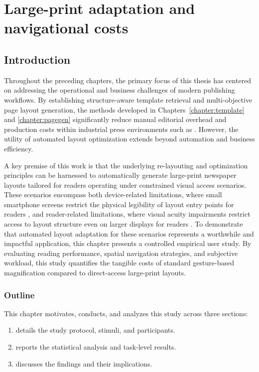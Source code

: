 \chapter{Large-print adaptation and navigational costs}
\label{chapter:magnification}


\section{Introduction}
\label{sec:magnification-overview}

Throughout the preceding chapters, the primary focus of this thesis has centered on addressing the operational and business challenges of modern publishing workflows. By establishing structure-aware template retrieval and multi-objective page layout generation, the methods developed in Chapters~\ref{chapter:template} and \ref{chapter:pagegen} significantly reduce manual editorial overhead and production costs within industrial press environments such as \melody. However, the utility of automated layout optimization extends beyond automation and business efficiency.

A key premise of this work is that the underlying re-layouting and optimization principles can be harnessed to automatically generate large-print newspaper layouts tailored for readers operating under constrained visual access scenarios. These scenarios encompass both device-related limitations, where small smartphone screens restrict the physical legibility of layout entry points for readers \NV, and reader-related limitations, where visual acuity impairments restrict access to layout structure even on larger displays for readers \LV. To demonstrate that automated layout adaptation for these scenarios represents a worthwhile and impactful application, this chapter presents a controlled empirical user study. By evaluating reading performance, spatial navigation strategies, and subjective workload, this study quantifies the tangible costs of standard gesture-based magnification compared to direct-access large-print layouts.



\subsection*{Outline}

This chapter motivates, conducts, and analyzes this study across three sections:
\begin{enumerate}
    \item {} details the study protocol, stimuli, and participants.
    \item {} reports the statistical analysis and task-level results.
    \item {} discusses the findings and their implications.
\end{enumerate}

